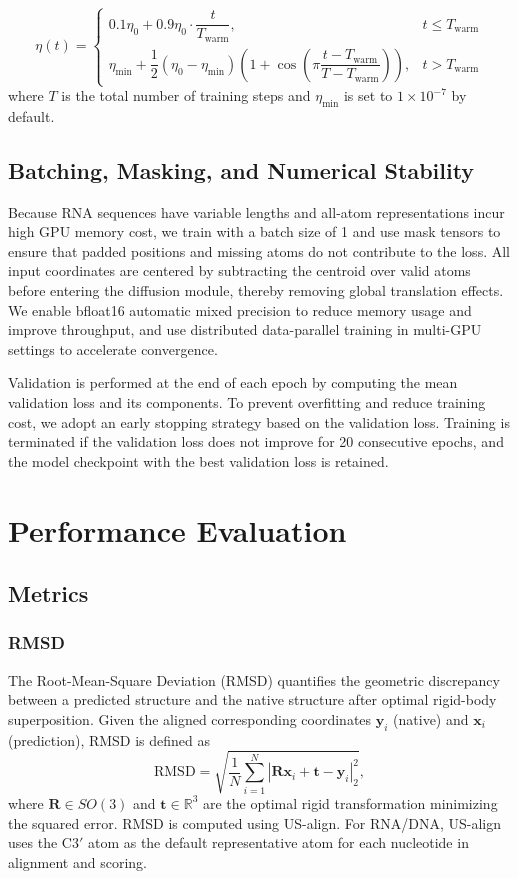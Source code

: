 $$
\eta(t)=  
\begin{cases}  
0.1\eta_0 + 0.9\eta_0 \cdot \dfrac{t}{T_{\mathrm{warm}}}, & t \le T_{\mathrm{warm}}\\
\eta_{\min} + \dfrac{1}{2}(\eta_0-\eta_{\min})\left(1+\cos\left(\pi \dfrac{t-T_{\mathrm{warm}}}{T-T_{\mathrm{warm}}}\right)\right), & t > T_{\mathrm{warm}} 
\end{cases}  
$$
where $T$ is the total number of training steps and $\eta_{\min}$ is set to $1\times 10^{-7}$ by default.

\subsection{Batching, Masking, and Numerical Stability}

Because RNA sequences have variable lengths and all-atom representations incur high GPU memory cost, we train with a batch size of 1 and use mask tensors to ensure that padded positions and missing atoms do not contribute to the loss. All input coordinates are centered by subtracting the centroid over valid atoms before entering the diffusion module, thereby removing global translation effects. We enable bfloat16 automatic mixed precision to reduce memory usage and improve throughput, and use distributed data-parallel training in multi-GPU settings to accelerate convergence.

Validation is performed at the end of each epoch by computing the mean validation loss and its components. To prevent overfitting and reduce training cost, we adopt an early stopping strategy based on the validation loss. Training is terminated if the validation loss does not improve for 20 consecutive epochs, and the model checkpoint with the best validation loss is retained.

\section{Performance Evaluation}

\subsection{Metrics}
\subsubsection{RMSD}

The Root-Mean-Square Deviation (RMSD) quantifies the geometric discrepancy between a predicted structure and the native structure after optimal rigid-body superposition. Given the aligned corresponding coordinates ${\mathbf{y}_i}$ (native) and ${\mathbf{x}_i}$ (prediction), RMSD is defined as  
$$  
\mathrm{RMSD}=\sqrt{\frac{1}{N}\sum_{i=1}^{N}\left|\mathbf{R}\mathbf{x}_i+\mathbf{t}-\mathbf{y}_i\right|_2^2},  
$$  
where $\mathbf{R}\in SO(3)$ and $\mathbf{t}\in\mathbb{R}^3$ are the optimal rigid transformation minimizing the squared error. RMSD is computed using US-align\cite{zhang2022usalign}. For RNA/DNA, US-align uses the C3$'$ atom as the default representative atom for each nucleotide in alignment and scoring. 

